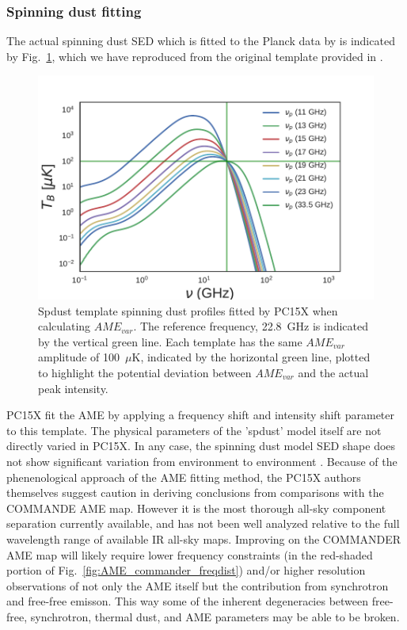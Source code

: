         \subsubsection{Spinning dust fitting}
          The actual spinning dust SED which is fitted to the Planck data by is indicated by Fig.~\ref{fig:AME_commander_freqshift_templ}, which we have reproduced from the original template provided in \cite{ali-haimoud09}.
              \begin{figure}
                \includegraphics[width=\textwidth]{../Plots/ch_datasources/AME_commander_freqshift_templ.pdf}
                \centering
                \caption{Spdust template spinning dust profiles fitted by PC15X when calculating $AME_{var}$.  The reference frequency, 22.8~GHz is indicated by the vertical green line. Each template has the same $AME_{var}$ amplitude of 100~$\mu$K, indicated by the horizontal green line, plotted to highlight the potential deviation between $AME_{var}$ and the actual peak intensity. }
                \label{fig:AME_commander_freqshift_templ}
              \end{figure}
          PC15X fit the AME by applying a frequency shift and intensity shift parameter to this template. The physical parameters of the 'spdust' model itself are not directly varied in PC15X. In any case, the spinning dust model SED shape does not show significant variation from environment to environment \citep{ali-haimoud09}.
         Because of the phenenological approach of the AME fitting method, the PC15X authors themselves suggest caution in deriving conclusions from comparisons with the COMMANDE AME map. However it is the most thorough all-sky component separation currently available, and has not been well analyzed relative to the full wavelength range of available IR all-sky maps. Improving on the COMMANDER AME map will likely require lower frequency constraints (in the red-shaded portion of Fig.~\ref{fig:AME_commander_freqdist}) and/or higher resolution observations of not only the AME itself but the contribution from synchrotron and free-free emisson. This way some of the inherent degeneracies between free-free, synchrotron, thermal dust, and AME parameters may be able to be broken.
